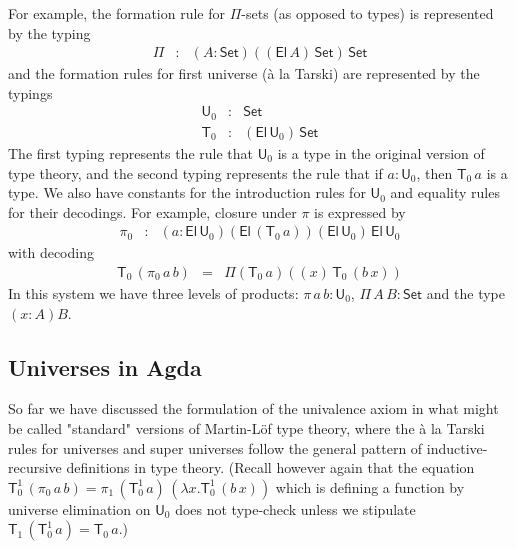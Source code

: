 \documentclass[11pt,a4paper]{article}
\def\UU{\mathsf{U}}
\newcommand{\Set}{\mathsf{Set}}
\newcommand{\El}{\mathsf{El}}
\newcommand{\T}{\mathsf{T}}
\begin{document}
For example, the formation rule for $\Pi$-sets (as opposed to types) is represented by the typing
\begin{eqnarray*}
\Pi &:& (A:\Set)((\El\,A)\,\Set)\,\Set
\end{eqnarray*}
and the formation rules for first universe (\`a la Tarski) are represented by the typings
\begin{eqnarray*}
\UU_0 &: &\Set\\
\T_0 &:& (\El\,\UU_0)\,\Set
\end{eqnarray*}
The first typing represents the rule that $\UU_0$ is a type in the original version of type theory, and the second typing represents the rule that if $a : \UU_0$, then $\T_0\,a$ is a type. We also have constants for the introduction rules for $\UU_0$ and equality rules for their decodings. For example, closure under $\pi$ is expressed by
\begin{eqnarray*}
\pi_0 &:& (a:\El\, \UU_0)(\El\, (\T_0\, a))(\El\, \UU_0)\,\El\, \UU_0
\end{eqnarray*}
with decoding
\begin{eqnarray*}
\T_0\, (\pi_0\, a\, b) &=& \Pi (\T_0\, a) ((x)\,\T_0\, (b\, x))
\end{eqnarray*}
In this system we have three levels of products: $\pi\,a\,b : \UU_0$, $\Pi\,A\,B : \Set$ and the type $(x : A)B$.
%
%
%

\subsection{Universes in Agda}\label{sec:Agda}

So far we have discussed the formulation of the univalence axiom in what might be called "standard" versions of Martin-Löf type theory, where the \`a la Tarski rules for universes and super universes follow the general pattern of inductive-recursive definitions in type theory. (Recall however again that the equation
$
\T_0^1\, (\pi_0\,a\, b) = \pi_1\,(\T_0^1\,a)\,(\lambda x.\T_0^1\,(b\,x))
$
which is defining a function by universe elimination on $\UU_0$ does not type-check unless we stipulate $\T_1\, (\T_0^1\, a) = \T_0\, a$.)
\end{document}
